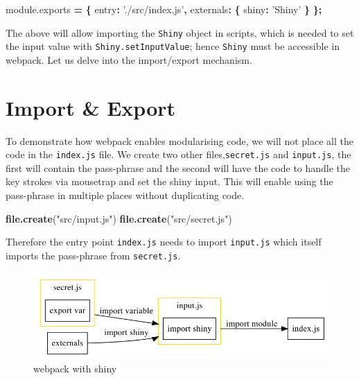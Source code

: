 \documentclass[10pt,]{krantz}
\makeatletter
\newenvironment{Shaded}{\begin{snugshade}}{\end{snugshade}}
\newcommand{\AttributeTok}[1]{\textcolor[rgb]{0.61,0.61,0.61}{#1}}
\newcommand{\DataTypeTok}[1]{\textcolor[rgb]{0.27,0.27,0.27}{#1}}
\newcommand{\KeywordTok}[1]{\textcolor[rgb]{0.27,0.27,0.27}{\textbf{#1}}}
\newcommand{\NormalTok}[1]{#1}
\newcommand{\OperatorTok}[1]{\textcolor[rgb]{0.43,0.43,0.43}{\textbf{#1}}}
\newcommand{\StringTok}[1]{\textcolor[rgb]{0.5,0.5,0.5}{#1}}
\newcommand{\VariableTok}[1]{\textcolor[rgb]{0,0,0}{#1}}
\newenvironment{kframe}{%
\medskip{}
\setlength{\fboxsep}{.8em}
 \def\at@end@of@kframe{}%
 \ifinner\ifhmode%
  \def\at@end@of@kframe{\end{minipage}}%
  \begin{minipage}{\columnwidth}%
 \fi\fi%
 \def\FrameCommand##1{\hskip\@totalleftmargin \hskip-\fboxsep
 \colorbox{shadecolor}{##1}\hskip-\fboxsep
     \hskip-\linewidth \hskip-\@totalleftmargin \hskip\columnwidth}%
 \MakeFramed {\advance\hsize-\width
   \@totalleftmargin\z@ \linewidth\hsize
   \@setminipage}}%
 {\par\unskip\endMakeFramed%
 \at@end@of@kframe}
\renewenvironment{Shaded}{\begin{kframe}}{\end{kframe}}
\makeatother
\begin{document}
\begin{Shaded}
\begin{Highlighting}[]
\VariableTok{module}\NormalTok{.}\AttributeTok{exports} \OperatorTok{=} \OperatorTok{\{}
  \DataTypeTok{entry}\OperatorTok{:} \StringTok{'./src/index.js'}\OperatorTok{,}
  \DataTypeTok{externals}\OperatorTok{:} \OperatorTok{\{}
    \DataTypeTok{shiny}\OperatorTok{:} \StringTok{'Shiny'}
  \OperatorTok{\}}
\OperatorTok{\};}
\end{Highlighting}
\end{Shaded}

The above will allow importing the \texttt{Shiny} object in scripts, which is needed to set the input value with \texttt{Shiny.setInputValue}; hence \texttt{Shiny} must be accessible in webpack. Let us delve into the import/export mechanism.

\hypertarget{webpack-intro-import-export}{%
\section{Import \& Export}\label{webpack-intro-import-export}}

To demonstrate how webpack enables modularising code, we will not place all the code in the \texttt{index.js} file. We create two other files,\texttt{secret.js} and \texttt{input.js}, the first will contain the pass-phrase and the second will have the code to handle the key strokes via mousetrap and set the shiny input. This will enable using the pass-phrase in multiple places without duplicating code.

\begin{Shaded}
\begin{Highlighting}[]
\KeywordTok{file.create}\NormalTok{(}\StringTok{"src/input.js"}\NormalTok{)}
\KeywordTok{file.create}\NormalTok{(}\StringTok{"src/secret.js"}\NormalTok{)}
\end{Highlighting}
\end{Shaded}

Therefore the entry point \texttt{index.js} needs to import \texttt{input.js} which itself imports the pass-phrase from \texttt{secret.js}.

\begin{figure}[H]

{\centering \includegraphics[width=1\linewidth]{images/07-webpack-shiny} 

}

\caption{webpack with shiny}\label{fig:webpack-shiny}
\end{figure}
\end{document}
